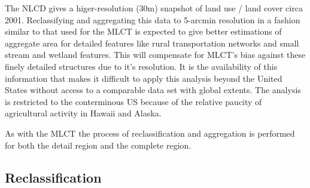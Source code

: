 \citet{Homer2004}


The NLCD gives a higer-resolution (30m) snapshot of land use / land
cover circa 2001.    Reclassifying and aggregating this
data to 5-arcmin resolution in a fashion similar to that used for the
MLCT is expected to give better estimations of aggregate area for
detailed features like rural transportation networks and small stream
and wetland features.  This will compensate for MLCT's bias against
these finely detailed structures due to it's resolution.  It is the
availability of this information that makes it difficult to apply this
analysis beyond the United States without access to a comparable data
set with global extents.  The analysis is restricted to the
conterminous US because of the relative paucity of agricultural
activity in Hawaii and Alaska.

As with the MLCT the process of reclassification and aggregation is
performed for both the detail region and the complete region.

\begin{Schunk}
\end{Schunk}
\subsection{Reclassification}
\label{sec:nlcd-reclass}


